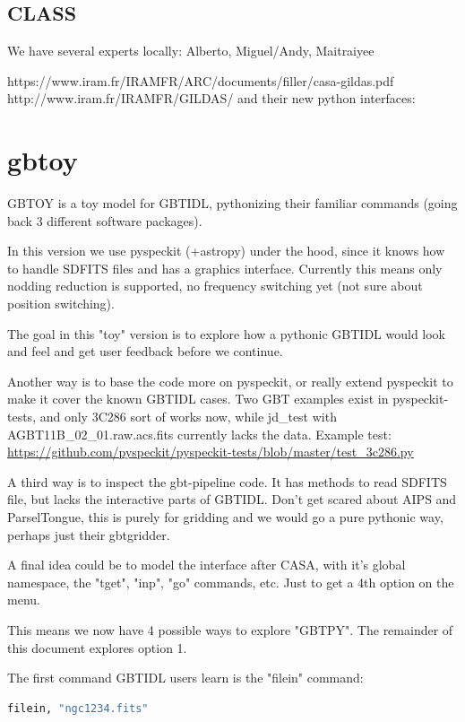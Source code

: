 \documentclass[12pt,a4paper]{article}
\begin{document}
\subsection{CLASS}

We have several experts locally: Alberto, Miguel/Andy, Maitraiyee
  
 https://www.iram.fr/IRAMFR/ARC/documents/filler/casa-gildas.pdf
       http://www.iram.fr/IRAMFR/GILDAS/
       and their new python interfaces:

\section{gbtoy}       

GBTOY is a toy model for GBTIDL, pythonizing their familiar commands
(going back 3 different software packages).

In this version we use pyspeckit (+astropy) under the hood, since it
knows how to handle SDFITS files and has a graphics
interface. Currently this means only nodding reduction is supported,
no frequency switching yet (not sure about position switching).

The goal in this "toy" version is to explore how a pythonic GBTIDL would
look and feel and get user feedback before we continue.

Another way is to base the code more on pyspeckit, or really extend
pyspeckit to make it cover the known GBTIDL cases.  Two GBT examples
exist in pyspeckit-tests, and only 3C286 sort of works now, while
jd\_test with AGBT11B\_02\_01.raw.acs.fits currently lacks the data.
Example test:  \url{https://github.com/pyspeckit/pyspeckit-tests/blob/master/test_3c286.py}

A third way is to inspect the gbt-pipeline code. It has methods to
read SDFITS file, but lacks the interactive parts of GBTIDL.  Don't
get scared about AIPS and ParselTongue, this is purely for gridding and
we would go a pure pythonic way, perhaps just their gbtgridder.


A final idea could be to model the interface after CASA, with it's
global namespace, the "tget", "inp", "go" commands, etc. Just to get
a 4th option on the menu.


This means we now have 4 possible ways to explore "GBTPY". The remainder
of this document explores option 1.




The first command GBTIDL users learn is the "filein" command:

\begin{lstlisting}[language=bash]
    filein, "ngc1234.fits"
\end{lstlisting}
\end{document}
